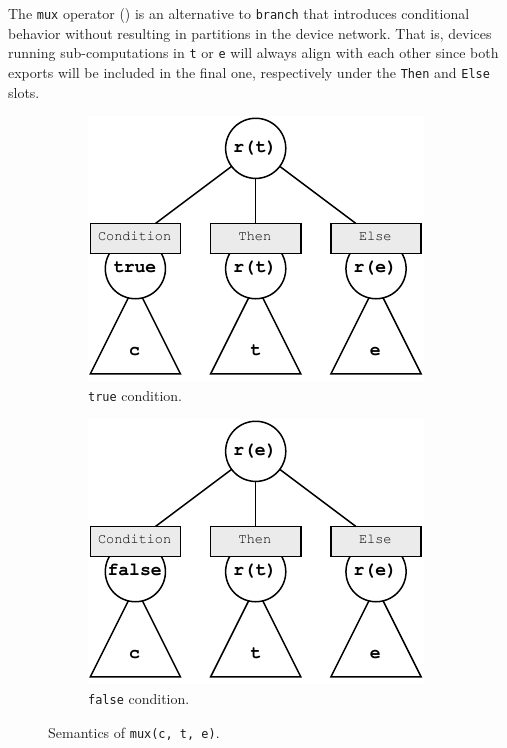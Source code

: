The \texttt{mux} operator () is an alternative to \texttt{branch} that introduces conditional behavior without resulting in partitions in the device network.
%
That is, devices running sub-computations in \texttt{t} or \texttt{e} will always align with each other since both exports will be included in the final one, respectively under the \texttt{Then} and \texttt{Else} slots.
%
\begin{figure}
    \centering
    \begin{subfigure}[b]{0.47\textwidth}
        \centering
        \includegraphics[width=\textwidth]{figures/semantics/mux-true.pdf}
        \caption{\texttt{true} condition.}
        \label{fig:semantics-mux-true}
    \end{subfigure}
    \hfill
    \begin{subfigure}[b]{0.47\textwidth}
        \centering
        \includegraphics[width=\textwidth]{figures/semantics/mux-false.pdf}
        \caption{\texttt{false} condition.}
        \label{fig:semantics-mux-false}
    \end{subfigure}
    \caption{Semantics of \texttt{mux(c, t, e)}.}
    \label{fig:semantics-mux}
\end{figure}

